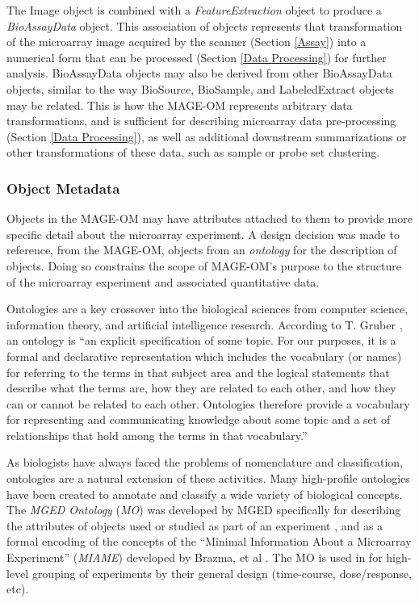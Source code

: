 The Image object is combined with a \emph{FeatureExtraction} object to produce
a \emph{BioAssayData} object.  This association of objects represents that
transformation of the microarray image acquired by the scanner (Section
\ref{Assay}) into a numerical form that can be processed (Section \ref{Data
Processing}) for further analysis.  BioAssayData objects may also be derived
from other BioAssayData objects, similar to the way BioSource, BioSample, and
LabeledExtract objects may be related.  This is how the MAGE-OM represents
arbitrary data transformations, and is sufficient for describing microarray
data pre-processing (Section \ref{Data Processing}), as well as additional
downstream summarizations or other transformations of these data, such as
sample or probe set clustering.

\subsubsection{Object Metadata}
\label{Object Metadata}

Objects in the MAGE-OM may have attributes attached to them to provide
more specific detail about the microarray experiment.  A design decision was
made to reference, from the MAGE-OM, objects from an \emph{ontology} for the
description of objects.  Doing so constrains the scope of MAGE-OM's purpose to
the structure of the microarray experiment and associated quantitative data.

Ontologies are a key crossover into the biological sciences from computer
science, information theory, and artificial intelligence research.  According
to T. Gruber \cite{XXX}, an ontology is ``an explicit specification of some
topic. For our purposes, it is a formal and declarative representation which
includes the vocabulary (or names) for referring to the terms in that subject
area and the logical statements that describe what the terms are, how they are
related to each other, and how they can or cannot be related to each other.
Ontologies therefore provide a vocabulary for representing and communicating
knowledge about some topic and a set of relationships that hold among the terms
in that vocabulary.''

As biologists have always faced the problems of nomenclature and
classification, ontologies are a natural extension of these activities.  Many
high-profile ontologies have been created to annotate and classify a wide
variety of biological concepts.  The \emph{MGED Ontology} (\emph{MO}) was
developed by MGED specifically for describing the attributes of objects used or
studied as part of an experiment \cite{XXX}, and as a formal encoding of the
concepts of the ``Minimal Information About a Microarray Experiment''
(\emph{MIAME}) developed by Brazma, et al \cite{brazma2001mim}.  The MO is used
in \dbthesis for high-level grouping of experiments by their general design
(time-course, dose/response, etc).

